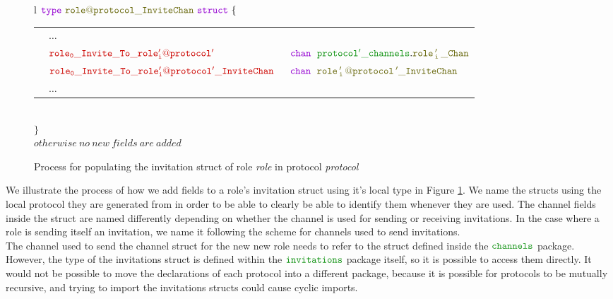 \documentclass[12pt,twoside]{report}
\begin{document}
\begin{figure}[!h]
\begin{center}
\begin{tabular}{l}
            {\footnotesize
            $\gotype\ \structname{\localprotocol{role}{protocol}\_InviteChan}\ \gostruct\ \{$}\\[3pt]

            {\footnotesize
            \begin{tabular}{lll}
                \indent & $\dots$ & \\[9pt]
                \indent & $\structfield{role_0\_Invite\_To\_\localprotocol{role'_i}{protocol'}}$\ &$\gochan\ \;\pkgstructaccess{protocol'\_channels}{role\,'_i\,\_Chan}$\\
                \indent & $\structfield{role_0\_Invite\_To\_\localprotocol{role'_i}{protocol'}\_InviteChan}$\ &$\gochan\ \; \structname{\localprotocol{role\,'_i\,}{protocol\,'}\_InviteChan}$\\
                [7pt]
                \indent & $\dots$ & 
            \end{tabular}}\\
            {\footnotesize$\}$}\\[6pt]
            
            $\mathit{otherwise\ no\ new\ fields\ are\ added}$
            
        \end{tabular}
    \end{center}
    \caption{Process for populating the invitation struct of role \textit{role} in protocol \textit{protocol}}
    \label{invitation-struct-gen}
\end{figure}

We illustrate the process of how we add fields to a role's invitation struct using it's local type in Figure \ref{invitation-struct-gen}. We name the structs using the local protocol they are generated from in order to be able to clearly be able to identify them whenever they are used. The channel fields inside the struct are named differently depending on whether the channel is used for sending or receiving invitations. In the case where a role is sending itself an invitation, we name it following the scheme for channels used to send invitations.\\

The channel used to send the channel struct for the new new role needs to refer to the struct defined inside the $\pkgname{channels}$ package. However, the type of the invitations struct is defined within the $\pkgname{invitations}$ package itself, so it is possible to access them directly. It would not be possible to move the declarations of each protocol into a different package, because it is possible for protocols to be mutually recursive, and trying to import the invitations structs could cause cyclic imports.\\
\end{document}
